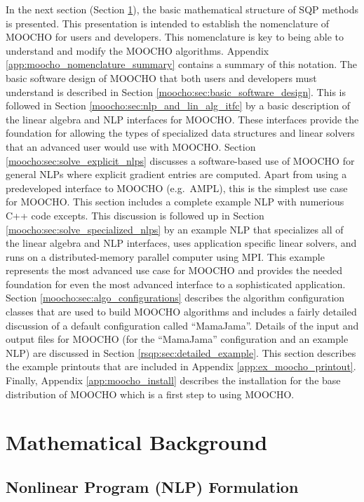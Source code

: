 \documentclass[pdf,ps2pdf,11pt]{SANDreport}
\begin{document}
In the next section (Section \ref{moocho:sec:sqp_background}), the
basic mathematical structure of SQP methods is presented.  This
presentation is intended to establish the nomenclature of MOOCHO for
users and developers.  This nomenclature is key to being able to
understand and modify the MOOCHO algorithms.  Appendix
\ref{app:moocho_nomenclature_summary} contains a summary of this
notation.  The basic software design of MOOCHO that both users and
developers must understand is described in Section
\ref{moocho:sec:basic_software_design}.  This is followed in Section
\ref{moocho:sec:nlp_and_lin_alg_itfc} by a basic description of the
linear algebra and NLP interfaces for MOOCHO.  These interfaces
provide the foundation for allowing the types of specialized data
structures and linear solvers that an advanced user would use with
MOOCHO.  Section \ref{moocho:sec:solve_explicit_nlps} discusses a
software-based use of MOOCHO for general NLPs where explicit gradient
entries are computed.  Apart from using a predeveloped interface to
MOOCHO (e.g.~AMPL), this is the simplest use case for MOOCHO.  This
section includes a complete example NLP with numerious C++ code
excepts.  This discussion is followed up in Section
\ref{moocho:sec:solve_specialized_nlps} by an example NLP that
specializes all of the linear algebra and NLP interfaces, uses
application specific linear solvers, and runs on a distributed-memory
parallel computer using MPI.  This example represents the most
advanced use case for MOOCHO and provides the needed foundation for
even the most advanced interface to a sophisticated application.
Section
\ref{moocho:sec:algo_configurations} describes the algorithm
configuration classes that are used to build MOOCHO algorithms and
includes a fairly detailed discussion of a default configuration
called ``MamaJama''.  Details of the input and output files for MOOCHO
(for the ``MamaJama'' configuration and an example NLP) are discussed
in Section \ref{rsqp:sec:detailed_example}. This section describes
the example printouts that are included in Appendix
\ref{app:ex_moocho_printout}.  Finally, Appendix
\ref{app:moocho_install} describes the installation for the base
distribution of MOOCHO which is a first step to using MOOCHO.

%
\section{Mathematical Background}
\label{moocho:sec:sqp_background}
%

%
\subsection{Nonlinear Program (NLP) Formulation}
\label{moocho:sec:nlp_formulation}
%
\end{document}
